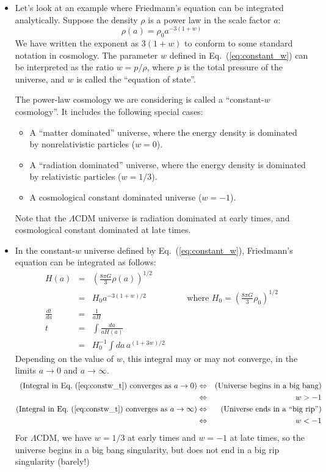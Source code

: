 \documentclass[aps,prd,superscriptaddress,groupedaddress,nofootinbib,nobibnotes]{revtex4}
\newcommand{\be}{\begin{equation}}
\newcommand{\ee}{\end{equation}}
\newcommand{\ba}{\begin{eqnarray}}
\newcommand{\ea}{\end{eqnarray}}
\newcommand{\nn}{\nonumber}
\begin{document}
\begin{itemize}
\item
Let's look at an example where Friedmann's equation can be integrated analytically.
Suppose the density $\rho$ is a power law in the scale factor $a$:
\be
\rho(a) = \rho_0 a^{-3(1+w)}  \label{eq:constant_w}
\ee
We have written the exponent as $3(1+w)$ to conform to some standard notation in cosmology.
The parameter $w$ defined in Eq.~(\ref{eq:constant_w}) can be interpreted as the ratio $w = p/\rho$,
where $p$ is the total pressure of the universe, and $w$ is called the ``equation of state''.

The power-law cosmology we are considering is called a ``constant-$w$ cosmology''.
It includes the following special cases:
\begin{itemize}
\item A ``matter dominated'' universe, where the energy density is dominated by nonrelativistic particles ($w=0$).
\item A ``radiation dominated'' universe, where the energy density is dominated by relativistic particles ($w=1/3$).
\item A cosmological constant dominated universe ($w=-1$).
\end{itemize}
Note that the $\Lambda$CDM universe is radiation dominated at early times, and cosmological
constant dominated at late times.

\item
In the constant-$w$ universe defined by Eq.~(\ref{eq:constant_w}), Friedmann's equation can be integrated as follows:
\ba
H(a) 
  &=& \left( \frac{8\pi G}{3} \rho(a) \right)^{1/2} \nn \\
  &=& H_0 a^{-3(1+w)/2} \hspace{2cm} \mbox{where } H_0 = \left( \frac{8\pi G}{3} \rho_0 \right)^{1/2} \\
\frac{dt}{da} 
  &=& \frac{1}{aH} \\
t
  &=& \int \frac{da}{a H(a)} \nn \\
  &=& H_0^{-1} \int da \, a^{(1+3w)/2}  \label{eq:constw_t}
\ea
Depending on the value of $w$, this integral may or may not converge, in the limits $a\rightarrow 0$ and $a \rightarrow \infty$.
\ba
\mbox{(Integral in Eq.~(\ref{eq:constw_t}) converges as $a\rightarrow 0$)}
 & \Leftrightarrow &
\mbox{(Universe begins in a big bang)} \nn \\
 & \Leftrightarrow &
w > -1 \\
\mbox{(Integral in Eq.~(\ref{eq:constw_t}) converges as $a\rightarrow \infty$)}
 & \Leftrightarrow &
\mbox{(Universe ends in a ``big rip'')} \nn \\
 & \Leftrightarrow &
w < -1
\ea
For $\Lambda$CDM, we have $w=1/3$ at early times and $w=-1$ at late times,
so the universe begins in a big bang singularity, but does not end in a big
rip singularity (barely!)


\end{itemize}
\end{document}
